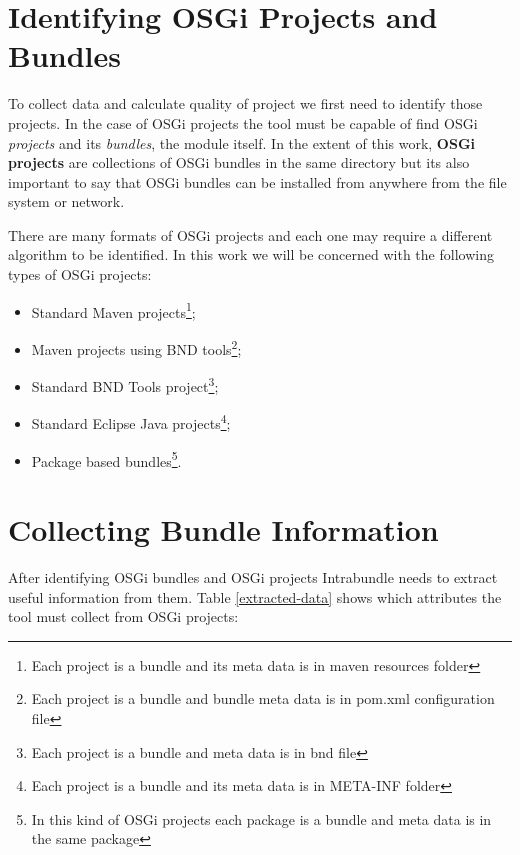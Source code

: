 \section{Identifying OSGi Projects and Bundles}
To collect data and calculate quality of project we first need to identify those projects. In the case of OSGi projects the tool must be capable of find OSGi \emph{projects} and its \emph{bundles}, the module itself. In the extent of this work, \textbf{OSGi projects} are collections of OSGi bundles in the same directory but its also important to say that OSGi bundles can be installed from anywhere from the file system or network.

There are many formats of OSGi projects and each one may require a different algorithm to be identified. In this work we will be concerned with the following types of OSGi projects: 

\begin{itemize}
\item Standard Maven projects\footnote{Each project is a bundle and its meta data is in maven resources folder};
\item Maven projects using BND tools\footnote{Each project is a bundle and bundle meta data is in pom.xml configuration file};  
\item Standard BND Tools project\footnote{Each project is a bundle and meta data is in bnd file};
\item Standard Eclipse Java projects\footnote{Each project is a bundle and its meta data is in META-INF folder};
\item Package based bundles\footnote{In this kind of OSGi projects each package is a bundle and meta data is in the same package}.
\end{itemize}

\section{Collecting Bundle Information}
\label{sec:collecting-data}
After identifying OSGi bundles and OSGi projects Intrabundle needs to extract useful information from them. Table \ref{extracted-data} shows which attributes the tool must collect from OSGi projects:

